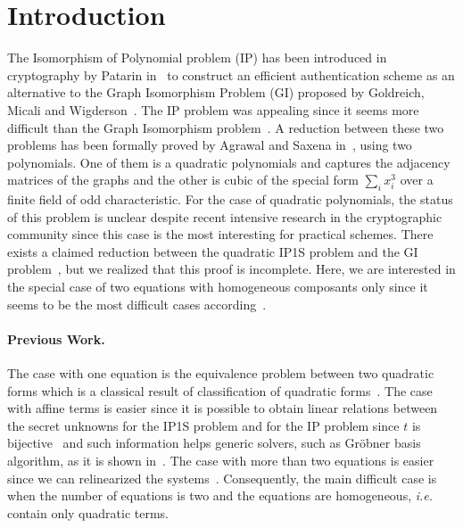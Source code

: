 \documentclass{lms}%
\begin{document}
\section{Introduction}
The Isomorphism of Polynomial problem (IP) has been introduced in cryptography by Patarin in~\cite{DBLP:conf/eurocrypt/Patarin96} to construct an efficient authentication scheme 
as an alternative to the Graph Isomorphism Problem (GI) proposed by Goldreich, Micali and Wigderson~\cite{DBLP:journals/jacm/GoldreichMW91}. The IP problem was appealing since 
it seems more difficult than the Graph Isomorphism problem~\cite{DBLP:conf/eurocrypt/PatarinGC98}. 
A reduction between these
two problems has been formally proved by Agrawal and Saxena in~\cite{DBLP:conf/stacs/AgrawalS06}, 
using two polynomials. One of them is a quadratic polynomials and captures the adjacency 
matrices of the graphs and the other is cubic of the special form $\sum_{i} x_i^3$ over a 
finite field of odd characteristic. 
For the case of quadratic polynomials, the status of this problem is unclear despite recent 
intensive research in the cryptographic community since this case is the most interesting 
for practical schemes. There exists a claimed reduction between the quadratic IP1S problem and the GI
problem~\cite{DBLP:conf/eurocrypt/PatarinGC98}, but we realized that this proof is incomplete. 
Here, we are interested in the special case of two equations with homogeneous composants only 
since it seems to be the most difficult cases according~\cite{DBLP:conf/eurocrypt/Perret05,DBLP:conf/eurocrypt/FaugereP06,DBLP:conf/pkc/BouillaguetFFP11,DBLP:conf/eurocrypt/BouillaguetFV13}. 


\paragraph{Previous Work.}
The case with one equation is the equivalence problem between two quadratic forms which 
is a classical result of classification of quadratic forms~\cite{lidl1997finite}. The case with 
affine terms is easier since it is possible to obtain linear relations between the secret unknowns
for the IP1S problem and for the IP problem since $t$ is bijective~\cite{DBLP:conf/eurocrypt/PatarinGC98} 
and such information helps generic solvers, such as Gröbner basis algorithm, as it is shown in~\cite{DBLP:conf/eurocrypt/FaugereP06}.  
The case with more than two equations is easier since we can relinearized the 
systems~\cite{DBLP:conf/pkc/BouillaguetFFP11}. Consequently, the main difficult case is when the 
number of equations is two and the equations are homogeneous, \textit{i.e.} contain only quadratic terms. 
\end{document}
